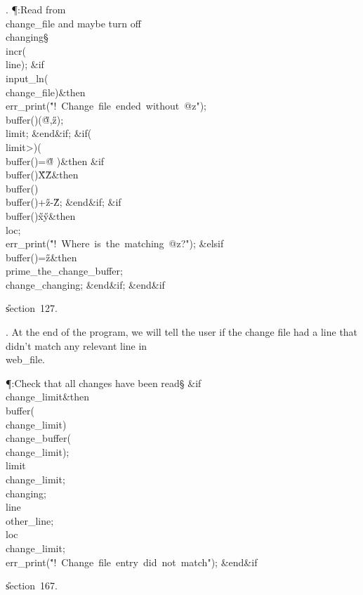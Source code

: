 . \P\?:Read from \\{change\_file} and maybe turn off \\{changing}\X\S%
\?\6
\\{incr}\?\1(\?\\{line}\?\2)\?;\6
\&{if}\1\1\?\8\R\?\\{input\_ln}\?\1(\?\\{change\_file}\?\2)\?\2\8\&{then}\6
\\{err\_print}\?\1(\?\.{"!\ Change\ file\ ended\ without\ @z"}\?\2)\?;\6
\\{buffer}\?\1(\?\to{}\?\2)\K\1(\?\H{@}\?,\?\H{z}\?\2)\?;\5
\\{limit}\?\K{};\2\6
\&{end}\8\2\&{if}\1;\6
\&{if}\1\1\?\8\1(\?\\{limit}\?>\?\2)\ANT\1(\?\\{buffer}\?\1(\?\2)=\?\H{@}%
\?\2)\?\2\8\&{then}\6
\&{if}\1\1\8\\{buffer}\?\1(\?\2)\in\?\H{X}\?\to\?\H{Z}\2\8\&{then}\6
\\{buffer}\?\1(\?\2)\K\?\\{buffer}\?\1(\?\2)+\?\H{z}\?-\?\H{Z};%
\2\6
\&{end}\8\2\&{if}\1;\6
\&{if}\1\1\8\\{buffer}\?\1(\?\2)\in\?\H{x}\?\to\?\H{y}\2\8\&{then}\6
\\{loc}\?\K{};\5
\\{err\_print}\?\1(\?\.{"!\ Where\ is\ the\ matching\ @z?"}\?\2)\?;\6
\4\&{elsif}\1\8\\{buffer}\?\1(\?\2)=\?\H{z}\2\8\&{then}\6
\\{prime\_the\_change\_buffer};\5
\\{change\_changing};\2\6
\&{end}\8\2\&{if}\1;\2\6
\&{end}\8\2\&{if}\1\par
\U section~127.\fi

. At the end of the program, we will tell the user if the change file
had a line that didn't match any relevant line in \\{web\_file}.

\Y\P\?\4:Check that all changes have been read\X\S\?\6
\&{if}\1\1\8\\{change\_limit}\?\I{}\2\8\&{then}\6
\\{buffer}\?\1(\?\to\?\\{change\_limit}\?\2)\K\?\\{change\_buffer}\?\1(\?%
\to\?\\{change\_limit}\?\2)\?;\5
\\{limit}\?\K\?\\{change\_limit};\5
\\{changing}\?\K\?;\5
\\{line}\?\K\?\\{other\_line};\5
\\{loc}\?\K\?\\{change\_limit};\5
\\{err\_print}\?\1(\?\.{"!\ Change\ file\ entry\ did\ not\ match"}\?\2)\?;\2\6
\&{end}\8\2\&{if}\1\par
\U section~167.\fi

